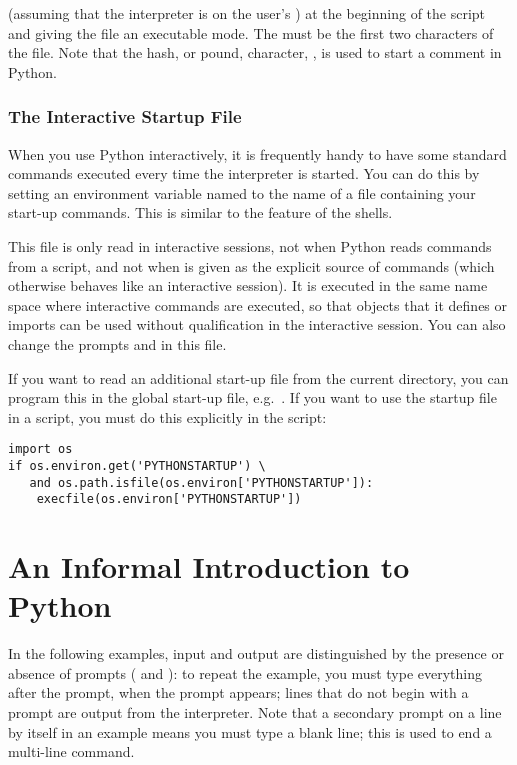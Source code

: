 \documentclass{manual}
\begin{document}
(assuming that the interpreter is on the user's ) at the
beginning of the script and giving the file an executable mode.  The
\samp{\#!} must be the first two characters of the file.  Note that
the hash, or pound, character, \character{\#}, is used to start a
comment in Python.

\subsection{The Interactive Startup File \label{startup}}


When you use Python interactively, it is frequently handy to have some
standard commands executed every time the interpreter is started.  You
can do this by setting an environment variable named
 to the name of a file containing your start-up
commands.  This is similar to the  feature of the
\UNIX{} shells.

This file is only read in interactive sessions, not when Python reads
commands from a script, and not when  is given as the
explicit source of commands (which otherwise behaves like an
interactive session).  It is executed in the same name space where
interactive commands are executed, so that objects that it defines or
imports can be used without qualification in the interactive session.
You can also change the prompts  and  in
this file.

If you want to read an additional start-up file from the current
directory, you can program this in the global start-up file,
e.g.\ .  If
you want to use the startup file in a script, you must do this
explicitly in the script:

\begin{verbatim}
import os
if os.environ.get('PYTHONSTARTUP') \
   and os.path.isfile(os.environ['PYTHONSTARTUP']):
    execfile(os.environ['PYTHONSTARTUP'])
\end{verbatim}


\chapter{An Informal Introduction to Python \label{informal}}

In the following examples, input and output are distinguished by the
presence or absence of prompts (\samp{>>>~} and \samp{...~}): to repeat
the example, you must type everything after the prompt, when the
prompt appears; lines that do not begin with a prompt are output from
the interpreter. %
Note that a secondary prompt on a line by itself in an example means
you must type a blank line; this is used to end a multi-line command.
\end{document}
